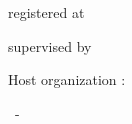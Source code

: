 \begin{center}
{\large registered at \UniversityName } \\



\vspace*{5mm} 



{\large supervised by  \Supervisor } \\


\vspace*{20mm} 




{\large Host organization :   \HostOrganization }


\vspace*{5mm} 


{\large  \CityName~- \CountryName} \\

\vspace*{5mm} 







\end{center}
